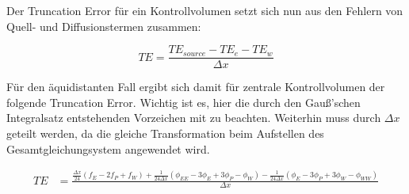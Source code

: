 \documentclass[11pt, ngerman,colorback,accentcolor=tud2d]{tudreport}
\begin{document}
Der Truncation Error für ein Kontrollvolumen setzt sich nun aus den Fehlern von Quell-
und Diffusionstermen zusammen:

\begin{equation*}
  TE = \frac{TE_{source} - TE_e - TE_w}{\Delta x}
\end{equation*}

Für den äquidistanten Fall ergibt sich damit für zentrale Kontrollvolumen der folgende
Truncation Error. Wichtig ist es, hier die durch den Gauß'schen Integralsatz 
entstehenden Vorzeichen mit zu beachten. Weiterhin muss durch $\Delta x$ geteilt werden,
da die gleiche Transformation beim Aufstellen des Gesamtgleichungsystem angewendet wird.

\begin{align}
  TE &= \frac{\frac{\Delta x}{24} \left({f_E-2f_P+f_W}\right)
   +\frac{1}{24\Delta x}\left({
\phi_{EE}-3\phi_E+3\phi_P-\phi_W}\right)
  -\frac{1}{24 \Delta x}\left({
\phi_E-3\phi_P+3\phi_W-\phi_{WW}}\right)}{\Delta x}
\end{align}







  
\end{document}
